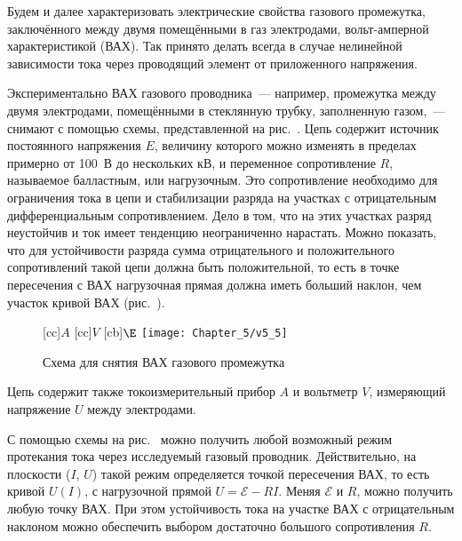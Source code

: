 Будем и далее характеризовать электрические свойства газового промежутка, заключённого между двумя помещёнными в газ
электродами, вольт-амперной характеристикой (ВАХ). Так принято делать всегда в случае нелинейной зависимости тока через
проводящий элемент от приложенного напряжения.

Экспериментально ВАХ газового проводника~--- например, промежутка между двумя электродами, помещёнными в стеклянную
трубку, заполненную газом,~--- снимают с помощью схемы, представленной на рис.~. Цепь содержит источник постоянного
напряжения $E$, величину которого можно изменять в пределах примерно от 100~В до нескольких кВ, и переменное
сопротивление $R$, называемое балластным, или нагрузочным. Это сопротивление необходимо для ограничения тока в цепи и
стабилизации разряда на участках с отрицательным дифференциальным сопротивлением. Дело в том, что на этих участках
разряд неустойчив и ток имеет тенденцию неограниченно нарастать. Можно показать, что для устойчивости разряда сумма
отрицательного и положительного сопротивлений такой цепи должна быть положительной, то есть в точке пересечения с ВАХ
нагрузочная прямая должна иметь больший наклон, чем участок кривой ВАХ (рис.~).

\begin{figure}[h!]
	\centering
	[cc]{$A$}
	[cc]{$V$}
	[cb]{$\E$}
	\texttt{[image: Chapter\_5/v5\_5]}
	\caption{Схема для снятия ВАХ газового промежутка}
\end{figure}


Цепь содержит также токоизмерительный прибор $A$ и вольтметр $V$, измеряющий напряжение $U$ между электродами.

С помощью схемы на рис.~ можно получить любой возможный режим протекания тока через исследуемый газовый проводник.
Действительно, на плоскости ($I$, $U$) такой режим определяется точкой пересечения ВАХ, то есть кривой $U(I)$, с
нагрузочной прямой $U=\mathscr{E}-RI$. Меняя $\mathscr{E}$ и $R$, можно получить любую точку ВАХ. При этом устойчивость тока на участке
ВАХ с отрицательным наклоном можно обеспечить выбором достаточно большого сопротивления $R$.

